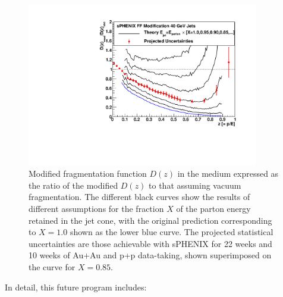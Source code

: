 \begin{figure}
\includegraphics[width=0.9\textwidth]{fig/figure_ffmodification.pdf}
\caption[Projected sPHENIX statistical uncertainties on modified fragmentation functions]{Modified fragmentation function $D(z)$ in the medium\cite{Armesto:2007dt} expressed as the ratio of the modified $D(z)$ to that assuming vacuum fragmentation. The different black curves show the results of different assumptions for the fraction $X$ of the parton energy retained in the jet cone, with the original prediction corresponding to $X = 1.0$ shown as the lower blue curve. The projected statistical uncertainties are those achievable with sPHENIX for 22 weeks and 10 weeks of Au+Au and p+p data-taking, shown superimposed on the curve for $X = 0.85$. }
\label{Fig:sPHENIXfragfn}
\end{figure}
In detail, this future program includes:
